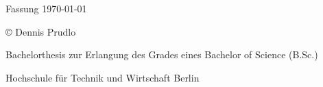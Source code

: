 \maketitle
\pagestyle{empty}

Fassung \today
\mbox{}\vfill
\footnotesize{%
	© \the\year{} Dennis Prudlo\par
	Bachelorthesis zur Erlangung des Grades eines Bachelor of Science (B.Sc.)\par
	Hochschule für Technik und Wirtschaft Berlin
}
\restoregeometry
\clearpage
